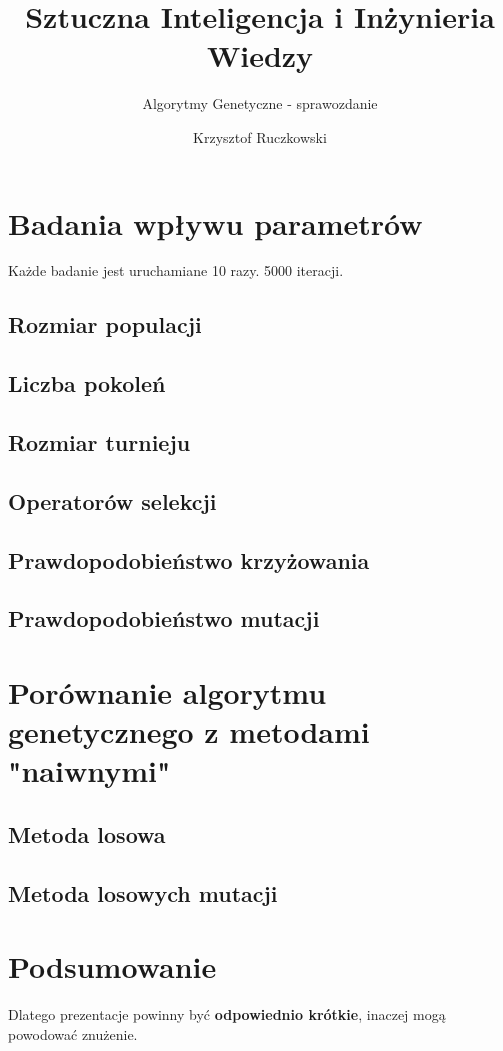 \documentclass[12pt,a4paper]{article}
\author{Krzysztof Ruczkowski}
\title{Sztuczna Inteligencja i Inżynieria Wiedzy}
\subtitle{Algorytmy Genetyczne - sprawozdanie}
\begin{document}
\maketitle
\tableofcontents
\newpage

\section{Badania wpływu parametrów}
Każde badanie jest uruchamiane 10 razy.
5000 iteracji.
\subsection{Rozmiar populacji}
\subsection{Liczba pokoleń}
\subsection{Rozmiar turnieju}
\subsection{Operatorów selekcji}
\subsection{Prawdopodobieństwo krzyżowania}
\subsection{Prawdopodobieństwo mutacji}
\section{Porównanie algorytmu genetycznego z metodami "naiwnymi"}
\subsection{Metoda losowa}
\subsection{Metoda losowych mutacji}

\section{Podsumowanie}

Dlatego prezentacje powinny być \textbf{odpowiednio krótkie}, inaczej mogą powodować znużenie.
\end{document}
